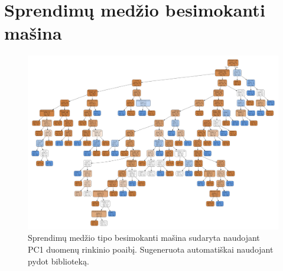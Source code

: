 \documentclass{VUMIFPSbakalaurinis}
\begin{document}
\section{Sprendimų medžio besimokanti mašina}
\begin{figure}[H]
    \centering
    \includegraphics[scale=0.24, angle=90]{img/tree}
    \caption{Sprendimų medžio tipo besimokanti mašina sudaryta naudojant PC1 duomenų rinkinio poaibį. Sugeneruota automatiškai naudojant pydot biblioteką.}
    \label{img:tree}
\end{figure}
\end{document}
